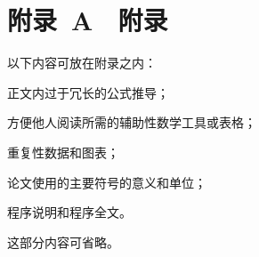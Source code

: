 
\chapter*{\hfill 附录~A　附录\hfill} %
\renewcommand{\thetable}{A.\arabic{table}}
\renewcommand{\thefigure}{A.\arabic{figure}}
\renewcommand{\theequation}{A\arabic{equation}}

以下内容可放在附录之内：

\begin{asparaenum}
\item 正文内过于冗长的公式推导；
\item 方便他人阅读所需的辅助性数学工具或表格；
\item 重复性数据和图表；
\item 论文使用的主要符号的意义和单位；
\item 程序说明和程序全文。
\end{asparaenum}

这部分内容可省略。